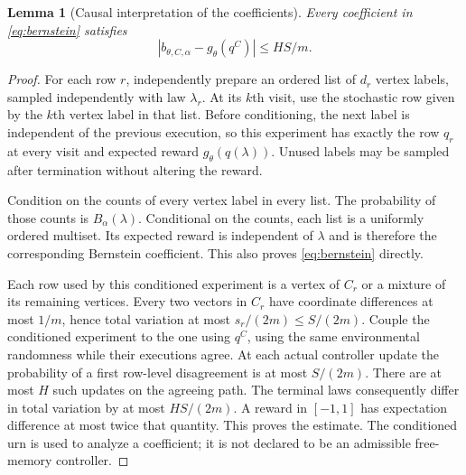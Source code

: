 \documentclass[11pt]{amsart}
\newtheorem{lemma}[theorem]{Lemma}
\theoremstyle{definition}\newtheorem{definition}[theorem]{Definition}
\theoremstyle{remark}\newtheorem{remark}[theorem]{Remark}
\newcommand{\1}{\mathbf 1}
\begin{document}
\begin{lemma}[Causal interpretation of the coefficients]\label{lem:urn}
Every coefficient in \eqref{eq:bernstein} satisfies
\[
       |b_{\theta,C,\alpha}-g_\theta(q^C)|\le HS/m.
\]
\end{lemma}
\begin{proof}
For each row $r$, independently prepare an ordered list of $d_r$ vertex
labels, sampled independently with law $\lambda_r$. At its $k$th visit,
use the stochastic row given by the $k$th vertex label in that list.
Before conditioning, the next label is independent of the previous
execution, so this experiment has exactly the row $q_r$ at every visit
and expected reward $g_\theta(q(\lambda))$. Unused labels may be sampled
after termination without altering the reward.

Condition on the counts of every vertex label in every list. The
probability of those counts is $B_\alpha(\lambda)$. Conditional on the
counts, each list is a uniformly ordered multiset. Its expected reward
is independent of $\lambda$ and is therefore the corresponding Bernstein
coefficient. This also proves \eqref{eq:bernstein} directly.

Each row used by this conditioned experiment is a vertex of $C_r$ or a
mixture of its remaining vertices. Every two vectors in $C_r$ have
coordinate differences at most $1/m$, hence total variation at most
$s_r/(2m)\le S/(2m)$. Couple the conditioned experiment to the one using
$q^C$, using the same environmental randomness while their executions
agree. At each actual controller update the probability of a first
row-level disagreement is at most $S/(2m)$. There are at most $H$ such
updates on the agreeing path. The terminal laws consequently differ in
total variation by at most $HS/(2m)$. A reward in $[-1,1]$ has expectation
difference at most twice that quantity. This proves the estimate. The
conditioned urn is used to analyze a coefficient; it is not declared to
be an admissible free-memory controller.
\end{proof}
\end{document}
